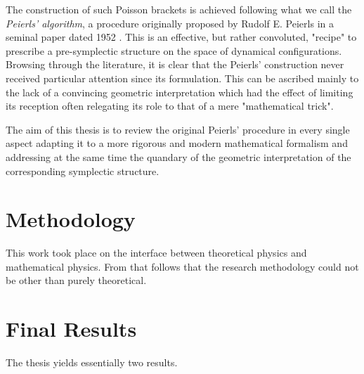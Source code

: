 \documentclass[a4paper,10pt]{amsart}
\begin{document}
    The construction of such Poisson brackets is achieved following what we call the \emph{Peierls' algorithm}, a procedure originally proposed by Rudolf E. Peierls in a seminal paper dated 1952 \cite{Peierls}. 
    This is an effective, but rather convoluted, "recipe"  to prescribe a pre-symplectic structure on the space of dynamical configurations. 
    Browsing through the literature, it is clear that the Peierls' construction never received particular attention since its formulation.
This can be ascribed mainly to the lack of a convincing geometric interpretation
which had the effect of limiting its reception often relegating its role to that of a mere  "mathematical trick".

\vspace{2mm}
The aim of this thesis is to review the original Peierls' procedure in every single aspect adapting it to a more rigorous and modern mathematical formalism and addressing at the same time the quandary of the geometric interpretation of the corresponding symplectic structure.

\section{Methodology}
This work took place on the interface between theoretical physics and mathematical physics.
From that follows that the research methodology could not be other than purely theoretical.



\section{Final Results}
The thesis yields essentially two results.
\end{document}
